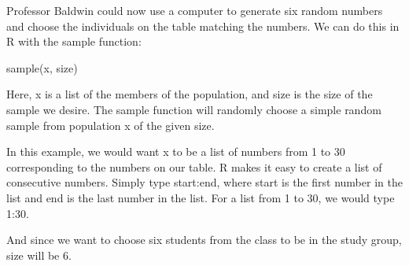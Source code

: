 \documentclass[letterpaper,10pt,english]{jupyterBook}
\begin{document}
\sphinxAtStartPar
Professor Baldwin could now use a computer to generate six random numbers and choose the individuals on the table matching the numbers. We can do this in R with the sample function:

\begin{sphinxVerbatim}[commandchars=\\\{\}]
sample(x, size)
\end{sphinxVerbatim}

\sphinxAtStartPar
Here, x is a list of the members of the population, and size is the size of the sample we desire. The sample function will randomly choose a simple random sample from population x of the given size.

\sphinxAtStartPar
In this example, we would want x to be a list of numbers from 1 to 30 corresponding to the numbers on our table. R makes it easy to create a list of consecutive numbers. Simply type start:end, where start is the first number in the list and end is the last number in the list. For a list from 1 to 30, we would type 1:30.

\sphinxAtStartPar
And since we want to choose six students from the class to be in the study group, size will be 6.
\end{document}
